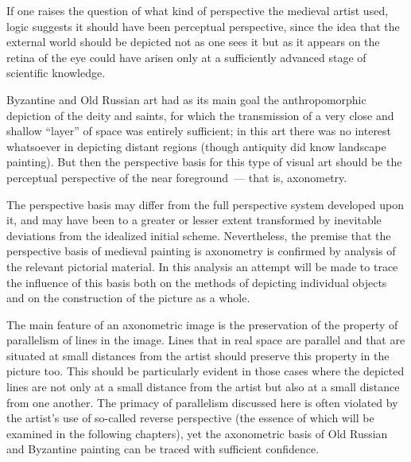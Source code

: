If one raises the question of what kind of perspective the medieval artist used, logic
suggests it should have been perceptual perspective, since the idea that the external
world should be depicted not as one sees it but as it appears on the retina of the eye
could have arisen only at a sufficiently advanced stage of scientific knowledge.


Byzantine and Old Russian art had as its main goal the anthropomorphic depiction of
the deity and saints, for which the transmission of a very close and shallow ``layer'' of
space was entirely sufficient; in this art there was no interest whatsoever in depicting
distant regions (though antiquity did know landscape painting).  But then the perspective
basis for this type of visual art should be the perceptual perspective of the near
foreground~--- that is, axonometry.

The perspective basis may differ from the full perspective system developed upon it,
and may have been to a greater or lesser extent transformed by inevitable deviations
from the idealized initial scheme.  Nevertheless, the premise that the perspective basis
of medieval painting is axonometry is confirmed by analysis of the relevant pictorial
material.  In this analysis an attempt will be made to trace the influence of this basis
both on the methods of depicting individual objects and on the construction of the
picture as a whole.

The main feature of an axonometric image is the preservation of the property of
parallelism of lines in the image.  Lines that in real space are parallel and that are
situated at small distances from the artist should preserve this property in the picture
too.  This should be particularly evident in those cases where the depicted lines are not
only at a small distance from the artist but also at a small distance from one another.
The primacy of parallelism discussed here is often violated by the artist's use of
so-called reverse perspective (the essence of which will be examined in the following
chapters), yet the axonometric basis of Old Russian and Byzantine painting can be traced
with sufficient confidence.

